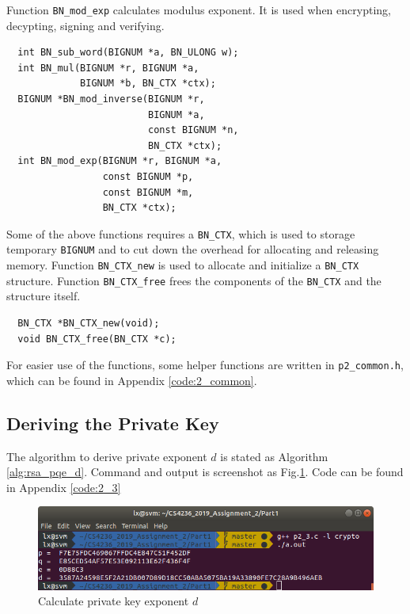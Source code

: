 Function \texttt{BN\_mod\_exp} calculates modulus exponent. It is used when encrypting, decypting, signing and verifying.
\begin{verbatim}
  int BN_sub_word(BIGNUM *a, BN_ULONG w);
  int BN_mul(BIGNUM *r, BIGNUM *a, 
             BIGNUM *b, BN_CTX *ctx);
  BIGNUM *BN_mod_inverse(BIGNUM *r, 
                         BIGNUM *a, 
                         const BIGNUM *n,
                         BN_CTX *ctx);
  int BN_mod_exp(BIGNUM *r, BIGNUM *a, 
                 const BIGNUM *p,
                 const BIGNUM *m, 
                 BN_CTX *ctx);
\end{verbatim}

Some of the above functions requires a \texttt{BN\_CTX}, which is used to storage temporary \texttt{BIGNUM} and to cut down the overhead for allocating and releasing memory.
Function \texttt{BN\_CTX\_new} is used to allocate and initialize a \texttt{BN\_CTX} structure.
Function \texttt{BN\_CTX\_free} frees the components of the \texttt{BN\_CTX} and the structure itself.
\begin{verbatim}
  BN_CTX *BN_CTX_new(void);
  void BN_CTX_free(BN_CTX *c);
\end{verbatim}

For easier use of the functions, some helper functions are written in \texttt{p2\_common.h}, which can be found in Appendix \ref{code:2_common}.

\subsection{Deriving the Private Key}

The algorithm to derive private exponent $d$ is stated as Algorithm \ref{alg:rsa_pqe_d}.
Command and output is screenshot as Fig.\ref{fig:p2_3}.
Code can be found in Appendix \ref{code:2_3}

\begin{figure}[ht!]
\centering
\includegraphics[width=\columnwidth]{pictures/p2_3.png}
\caption{
    Calculate private key exponent $d$
}
\label{fig:p2_3}
\end{figure}


